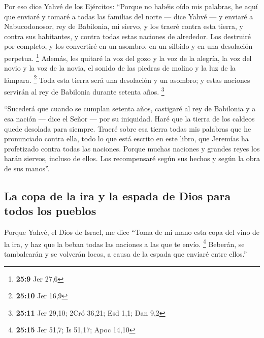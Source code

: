 \begin{paracol}{2}
 Por eso dice Yahvé de los Ejércitos: ``Porque no habéis
oído mis palabras,  he aquí que enviaré y tomaré a todas
las familias del norte --- dice Yahvé --- y enviaré a Nabucodonosor, rey
de Babilonia, mi siervo, y los traeré contra esta tierra, y contra sus
habitantes, y contra todas estas naciones de alrededor. Los destruiré
por completo, y los convertiré en un asombro, en un silbido y en una
desolación perpetua. \footnote{\textbf{25:9} Jer 27,6} 
Además, les quitaré la voz del gozo y la voz de la alegría, la voz del
novio y la voz de la novia, el sonido de las piedras de molino y la luz
de la lámpara. \footnote{\textbf{25:10} Jer 16,9}  Toda
esta tierra será una desolación y un asombro; y estas naciones servirán
al rey de Babilonia durante setenta años. \footnote{\textbf{25:11} Jer
  29,10; 2Cró 36,21; Esd 1,1; Dan 9,2}

 ``Sucederá que cuando se cumplan setenta años, castigaré
al rey de Babilonia y a esa nación --- dice el Señor --- por su
iniquidad. Haré que la tierra de los caldeos quede desolada para
siempre.  Traeré sobre esa tierra todas mis palabras que
he pronunciado contra ella, todo lo que está escrito en este libro, que
Jeremías ha profetizado contra todas las naciones. 
Porque muchas naciones y grandes reyes los harán siervos, incluso de
ellos. Los recompensaré según sus hechos y según la obra de sus manos''.

\hypertarget{la-copa-de-la-ira-y-la-espada-de-dios-para-todos-los-pueblos}{%
\subsection{La copa de la ira y la espada de Dios para todos los
pueblos}\label{la-copa-de-la-ira-y-la-espada-de-dios-para-todos-los-pueblos}}

 Porque Yahvé, el Dios de Israel, me dice ``Toma de mi
mano esta copa del vino de la ira, y haz que la beban todas las naciones
a las que te envío. \footnote{\textbf{25:15} Jer 51,7; Is 51,17; Apoc
  14,10}  Beberán, se tambalearán y se volverán locos, a
causa de la espada que enviaré entre ellos.''


\end{paracol}
